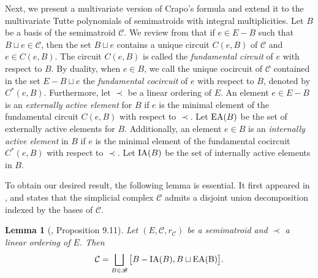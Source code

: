 \documentclass[12pt]{article}%
\numberwithin{equation}{section}
\newtheorem{lemma}[lemma]{Lemma}
\begin{document}
Next, we present a multivariate version of Crapo's formula and extend it to the multivariate Tutte polynomials of semimatroids with integral multiplicities. Let $B$ be a basis of the semimatroid $\mathcal{C}$. We review from \cite[Lemma 9.1]{Ardila2007} that if $e\in E-B$ such that $B\sqcup e\in\mathcal{C}$, then the set $B\sqcup e$ contains a unique circuit $C(e,B)$ of $\mathcal{C}$ and $e\in C(e,B)$. The circuit $C(e,B)$ is called the {\em fundamental circuit} of $e$ with respect to $B$. By duality, when $e\in B$, we call the unique cocircuit of $\mathcal{C}$ contained in the set $E-B\sqcup e$ the {\em fundamental cocircuit} of $e$ with respect to $B$, denoted by $C^*(e,B)$. Furthermore, let $\prec$ be a linear ordering of $E$. An element $e\in E-B$ is an {\em externally active element} for $B$ if $e$ is the minimal element of the fundamental circuit $C(e,B)$ with respect to $\prec$. Let ${\rm EA}(B)$ be the set of externally active elements  for $B$. Additionally, an element $e\in B$ is an {\em internally active element} in $B$ if $e$ is the minimal element of the fundamental cocircuit $C^*(e,B)$ with respect to $\prec$. Let ${\rm IA}(B)$ be the set of internally active elements in $B$.

To obtain our desired result, the following lemma is essential. It first appeared in \cite[Proposition 9.11]{Ardila2007}, and states that the simplicial complex $\mathcal{C}$ admits a disjoint union decomposition indexed by the bases of $\mathcal{C}$.
\begin{lemma}[\cite{Ardila2007}, Proposition 9.11]\label{Decomposition}
Let $(E,\mathcal{C},r_{\mathcal{C}})$ be a semimatroid and $\prec$ a linear ordering of $E$. Then
\[
\mathcal{C}=\bigsqcup_{B\in\mathscr{B}}\big[B-{\rm IA}(B),B\sqcup{\rm EA(B)}\big].
\]
\end{lemma}
\end{document}
